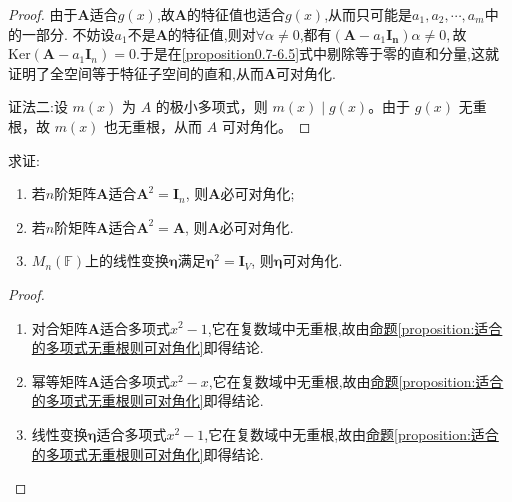 \documentclass[../../main.tex]{subfiles}%
\begin{document}
\begin{proof}
由于\(\boldsymbol{A}\)适合\(g(x)\),故\(\boldsymbol{A}\)的特征值也适合\(g(x)\),从而只可能是\(a_1,a_2,\cdots,a_m\)中的一部分. 
不妨设$a_1$不是$\boldsymbol{A}$的特征值,则对$\forall \alpha\ne 0$,都有$(\boldsymbol{A}-a_1\boldsymbol{I_n})\alpha \ne 0,$故$\mathrm{Ker}(\boldsymbol{A} - a_1\boldsymbol{I}_n)=0$.于是在\eqref{proposition0.7-6.5}式中剔除等于零的直和分量,这就证明了全空间等于特征子空间的直和,从而\(\boldsymbol{A}\)可对角化.

{\color{blue}证法二:}设 $m(x)$ 为 $A$ 的极小多项式，则 $m(x)\mid g(x)$。由于 $g(x)$ 无重根，故 $m(x)$ 也无重根，从而 $A$ 可对角化。

\end{proof}

\begin{example}\label{example0.7qew}
求证:
\begin{enumerate}[(1)]
\item 若\(n\)阶矩阵\(\boldsymbol{A}\)适合\(\boldsymbol{A}^2 = \boldsymbol{I}_n\), 则\(\boldsymbol{A}\)必可对角化;

\item 若\(n\)阶矩阵\(\boldsymbol{A}\)适合\(\boldsymbol{A}^2 = \boldsymbol{A}\), 则\(\boldsymbol{A}\)必可对角化.

\item \(M_n(\mathbb{F})\)上的线性变换\(\boldsymbol{\eta}\)满足\(\boldsymbol{\eta}^2 = \boldsymbol{I}_V\), 则\(\boldsymbol{\eta}\)可对角化.
\end{enumerate}
\end{example}
\begin{proof}
\begin{enumerate}[(1)]
\item 对合矩阵\(\boldsymbol{A}\)适合多项式\(x^2 - 1\),它在复数域中无重根,故由\hyperref[proposition:适合的多项式无重根则可对角化]{命题\ref{proposition:适合的多项式无重根则可对角化}}即得结论.

\item 幂等矩阵\(\boldsymbol{A}\)适合多项式\(x^2 - x\),它在复数域中无重根,故由\hyperref[proposition:适合的多项式无重根则可对角化]{命题\ref{proposition:适合的多项式无重根则可对角化}}即得结论.

\item 线性变换\(\boldsymbol{\eta}\)适合多项式$x^2-1$,它在复数域中无重根,故由\hyperref[proposition:适合的多项式无重根则可对角化]{命题\ref{proposition:适合的多项式无重根则可对角化}}即得结论.
\end{enumerate}

\end{proof}
\end{document}
